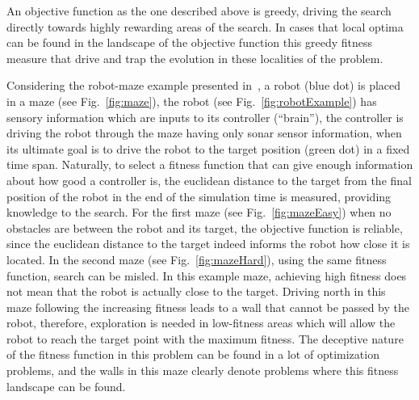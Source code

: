An objective function as the one described above is greedy, driving the search directly towards highly rewarding areas of the search. In cases that local optima can be found in the landscape of the objective function this greedy fitness measure that drive and trap the evolution in these localities of the problem.

Considering the robot-maze example presented in~\citep{lehman2011abandoning,lehman2010revising}, a robot (blue dot) is placed in a maze (see Fig.~\ref{fig:maze}), the robot (see Fig.~\ref{fig:robotExample}) has sensory information which are inputs to its controller (``brain''), the controller is driving the robot through the maze having only sonar sensor information, when its ultimate goal is to drive the robot to the target position (green dot) in a fixed time span. Naturally, to select a fitness function that can give enough information about how good a controller is, the euclidean distance to the target from the final position of the robot in the end of the simulation time is measured, providing knowledge to the search. For the first maze (see Fig.~\ref{fig:mazeEasy}) when no obstacles are between the robot and its target, the objective function is reliable, since the euclidean distance to the target indeed informs the robot how close it is located. In the second maze (see Fig.~\ref{fig:mazeHard}), using the same fitness function, search can be misled. In this example maze, achieving high fitness does not mean that the robot is actually close to the target. Driving north in this maze following the increasing fitness leads to a wall that cannot be passed by the robot, therefore, exploration is needed in low-fitness areas which will allow the robot to reach the target point with the maximum fitness. The deceptive nature of the fitness function in this problem can be found in a lot of optimization problems, and the walls in this maze clearly denote problems where this fitness landscape can be found. 

